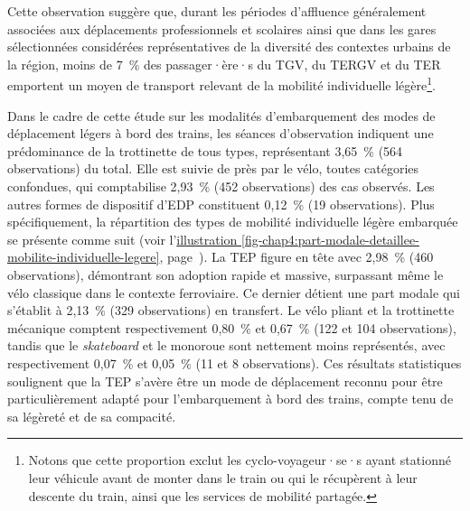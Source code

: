\begin{refsegment}
Cette observation suggère que, durant les périodes d'affluence généralement associées aux déplacements professionnels et scolaires ainsi que dans les gares sélectionnées considérées représentatives de la diversité des contextes urbains de la région, moins de 7~\% des passager·ère·s du \acrfull{TGV}, du \acrfull{TERGV} et du \acrfull{TER} emportent un moyen de transport relevant de la mobilité individuelle légère\footnote{
    Notons que cette proportion exclut les cyclo-voyageur·se·s ayant stationné leur véhicule avant de monter dans le train ou qui le récupèrent à leur descente du train, ainsi que les services de mobilité partagée.
}.%

Dans le cadre de cette étude sur les modalités d'embarquement des modes de déplacement légers à bord des trains, les séances d'observation indiquent une prédominance de la trottinette de tous types, représentant 3,65~\% (564 observations) du total. Elle est suivie de près par le vélo, toutes catégories confondues, qui comptabilise 2,93~\% (452 observations) des cas observés. Les autres formes de dispositif d'\acrfull{EDP} constituent 0,12~\% (19 observations). Plus spécifiquement, la répartition des types de mobilité individuelle légère embarquée se présente comme suit (voir l'\hyperref[fig-chap4:part-modale-detaillee-mobilite-individuelle-legere]{illustration \ref{fig-chap4:part-modale-detaillee-mobilite-individuelle-legere}}, page~\pageref{fig-chap4:part-modale-detaillee-mobilite-individuelle-legere}). La \acrshort{TEP} figure en tête avec 2,98~\% (460 observations), démontrant son adoption rapide et massive, surpassant même le vélo classique dans le contexte ferroviaire. Ce dernier détient une part modale qui s'établit à 2,13~\% (329 observations) en transfert. Le vélo pliant et la trottinette mécanique comptent respectivement 0,80~\% et 0,67~\% (122 et 104 observations), tandis que le \textsl{skateboard} et le monoroue sont nettement moins représentés, avec respectivement 0,07~\% et 0,05~\% (11 et 8 observations). Ces résultats statistiques soulignent que la \acrshort{TEP} s'avère être un mode de déplacement reconnu pour être particulièrement adapté pour l'embarquement à bord des trains, compte tenu de sa légèreté et de sa compacité.%


\end{refsegment}
